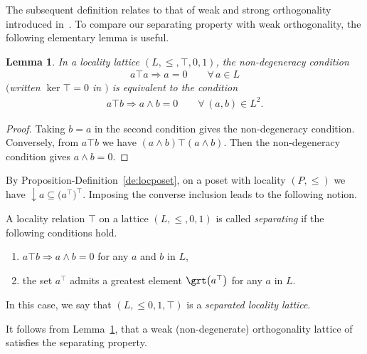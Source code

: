 \documentclass[10pt,a4paper]{amsart}
\numberwithin{equation}{section}
\newtheorem{Lemma}[Theorem]{Lemma}
\newcommand{\loc}{locality\xspace}
\newcommand{\pone}{separating\xspace }
\def \ptwob {separated\xspace }
\begin{document}
The subsequent definition relates to that of
	weak and strong orthogonality introduced in~\cite[Definition 2.2]{CM}. To compare our separating property with weak orthogonality, the following elementary lemma is useful.


\begin{Lemma}\label{lem:nondegseparating}
In a \loc lattice $(L, \leq, \top, 0, 1)$, the {\it non-degeneracy condition} \begin{gather*}%
a\top a\Longrightarrow a=0\qquad \forall\, a\in L
\end{gather*}
$($written $\ker \top =0$ in {\rm\cite{CM}}$)$ is equivalent to the condition
\begin{gather*}%
a\top b\Longrightarrow a\wedge b=0\qquad \forall\, (a, b)\in L^2.
\end{gather*}
\end{Lemma}

\begin{proof}
Taking $b=a$ in the second condition gives the non-degeneracy condition. Conversely, from $a\top b$ we have $(a\wedge b)\top (a\wedge b)$. Then the non-degeneracy condition gives $a\wedge b=0$.
\end{proof}

By Proposition-Definition~\ref{de:locposet}, on a poset with locality $(P, \leq)$ we have $\downarrow a\subseteq \big(a^\top\big)^\top $. Imposing the converse inclusion leads to the following notion.

\begin{Definition}\label{def:splitlattice}
	A \loc relation $\top$ on a lattice $(L, \leq, 0, 1) $
	is called {\it \pone} if the following conditions hold.
	\begin{enumerate}\itemsep=0pt
		\item[$(a)$] %
	 $a\top b\Rightarrow a\wedge b=0$ for any $a$ and $b$ in $L$,
		\item[$(b)$] the set $a^\top$ admits a greatest element $\grt\big(a^\top\big)$ for any $a$ in $L$.
	\end{enumerate}
In this case, we say that $(L, \leq 0, 1, \top) $ is a {\it \ptwob \loc lattice}.
\end{Definition}

\begin{Remark}
It follows from Lemma~\ref{lem:nondegseparating}, that a weak (non-degenerate) orthogonality lattice of~\cite[Definition 2.2]{CM} satisfies the separating property.
\end{Remark}
\end{document}

